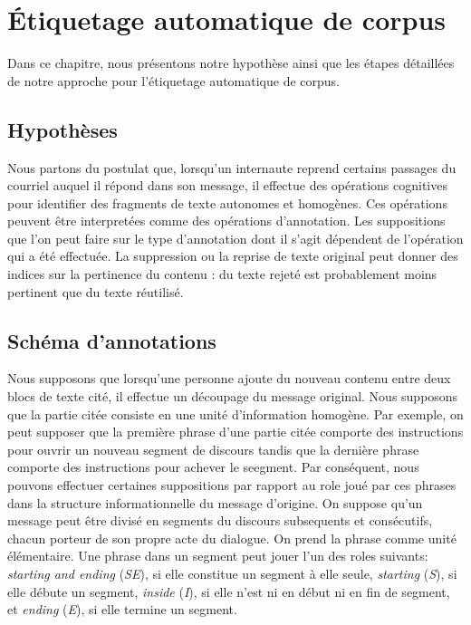 
\chapter{Étiquetage automatique de corpus}

\label{ch:methodology_for_automatic_corpora_annotation}

Dans ce chapitre, nous présentons notre hypothèse ainsi que les étapes détaillées de notre approche pour l'étiquetage automatique de corpus.

\section{Hypothèses}

Nous partons du postulat que, lorsqu'un internaute reprend certains passages du courriel auquel il répond dans son message, il effectue des opérations cognitives pour identifier des fragments de texte autonomes et homogènes. Ces opérations peuvent être interpretées comme des opérations d'annotation. Les suppositions que l'on peut faire sur le type d'annotation dont il s'agit dépendent de l'opération qui a été effectuée. La suppression ou la reprise de texte original peut donner des indices sur la pertinence du contenu : du texte rejeté est probablement moins pertinent que du texte réutilisé.

\section{Schéma d'annotations}

Nous supposons que lorsqu'une personne ajoute du nouveau contenu entre deux blocs de texte cité, il effectue un découpage du message original. Nous supposons que la partie citée consiste en une unité d'information homogène. Par exemple, on peut supposer que la première phrase d'une partie citée comporte des instructions pour ouvrir un nouveau segment de discours tandis que la dernière phrase comporte des instructions pour achever le seegment. Par conséquent, nous pouvons effectuer certaines suppositions par rapport au role joué par ces phrases dans la structure informationnelle du message d'origine. On suppose qu'un message peut être divisé en segments du discours subsequents et consécutifs, chacun porteur de son propre acte du dialogue. On prend la phrase comme unité élémentaire. Une phrase dans un segment peut jouer l'un des roles suivants: \emph{starting and ending} (\textit{SE}), si elle constitue un segment à elle seule, \emph{starting} (\textit{S}), si elle débute un segment, \emph{inside} (\textit{I}), si elle n'est ni en début ni en fin de segment, et \emph{ending} (\textit{E}), si elle termine un segment.

